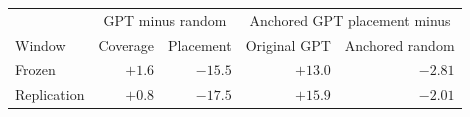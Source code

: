 \begin{tabular}{@{}lrrrr@{}}\toprule
& \multicolumn{2}{c}{GPT minus random} & \multicolumn{2}{c}{Anchored GPT placement minus}\\
Window & Coverage & Placement & Original GPT & Anchored random\\\midrule
Frozen & $+1.6$ & $-15.5$ & $+13.0$ & $-2.81$ \\
Replication & $+0.8$ & $-17.5$ & $+15.9$ & $-2.01$ \\
\bottomrule\end{tabular}
